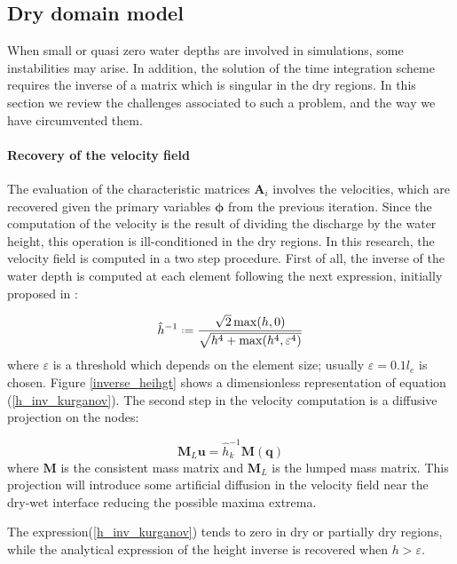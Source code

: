 \subsection{Dry domain model}

When small or quasi zero water depths are involved in simulations, some instabilities may arise. In addition, the solution of the time integration scheme requires the inverse of a matrix which is singular in the dry regions. In this section we review the challenges associated to such a problem, and the way we have circumvented them.

\paragraph{Recovery of the velocity field}
The evaluation of the characteristic matrices $\mathbf{A}_i$ involves the velocities, which are recovered given the primary variables $\bm{\phi}$ from the previous iteration.
Since the computation of the velocity is the result of dividing
the discharge by the water height, this operation is ill-conditioned in the dry regions. In this research, the velocity field is computed in a two step procedure. First of all, the inverse of the water depth is computed at each element following the next expression, initially proposed in \cite{kurganov2007}:

\begin{equation} \label{h_inv_kurganov}
\hat{h}^{-1} \defeq \frac{\sqrt{2}\max(h,0)}{\sqrt{h^4 + \max(h^4, \varepsilon^4)}}
\end{equation}
where $\varepsilon$ is a threshold which depends on the element size; usually $\varepsilon = 0.1 l_e$ is chosen. Figure \ref{inverse_heihgt} shows a dimensionless representation of equation (\ref{h_inv_kurganov}). The second step in the velocity computation is a diffusive projection on the nodes:

\begin{equation}
\mathbf{M}_L \mathbf{u} = \hat{h}^{-1}_k \mathbf{M} (\mathbf{q})
\end{equation}
where $\mathbf{M}$ is the consistent mass matrix and $\mathbf{M}_L$ is the lumped mass matrix. This projection will introduce some artificial diffusion in the velocity field near the dry-wet interface reducing the possible maxima extrema.

The expression(\ref{h_inv_kurganov}) tends to zero in dry or partially dry regions, while the analytical expression of the height inverse is recovered when $h>\varepsilon$.

